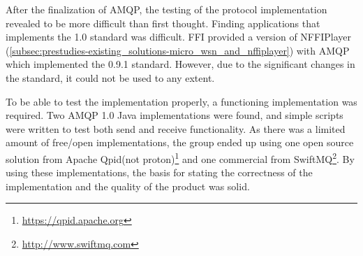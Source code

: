 After the finalization of AMQP, the testing of the protocol implementation revealed to be more difficult than first thought. Finding applications that implements the 1.0 standard was difficult. FFI provided a version of NFFIPlayer (\ref{subsec:prestudies-existing_solutions-micro_wsn_and_nffiplayer}) with AMQP which implemented the 0.9.1 standard. However, due to the significant changes in the standard, it could not be used to any extent.

To be able to test the implementation properly, a functioning implementation was required. Two AMQP 1.0 Java implementations were found, and simple scripts were written to test both send and receive functionality. As there was a limited amount of free/open implementations, the group ended up using one open source solution from Apache Qpid(not proton)\footnote{\url{https://qpid.apache.org}} and one commercial from SwiftMQ\footnote{\url{http://www.swiftmq.com}}. By using these implementations, the basis for stating the correctness of the implementation and the quality of the product was solid.

\clearpage